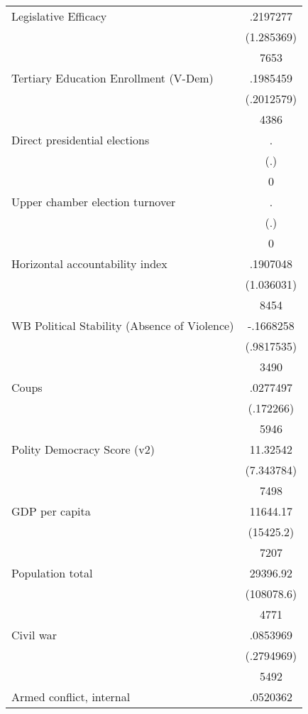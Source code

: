 {\begin{longtable}{l*{1}{c}}
Legislative Efficacy&    .2197277\\
                    &  (1.285369)\\
                    &        7653\\
Tertiary Education Enrollment (V-Dem)&    .1985459\\
                    &  (.2012579)\\
                    &        4386\\
Direct presidential elections&           .\\
                    &         (.)\\
                    &           0\\
Upper chamber election turnover&           .\\
                    &         (.)\\
                    &           0\\
Horizontal accountability index&    .1907048\\
                    &  (1.036031)\\
                    &        8454\\
WB Political Stability (Absence of Violence)&   -.1668258\\
                    &  (.9817535)\\
                    &        3490\\
Coups               &    .0277497\\
                    &   (.172266)\\
                    &        5946\\
Polity Democracy Score (v2)&    11.32542\\
                    &  (7.343784)\\
                    &        7498\\
GDP per capita      &    11644.17\\
                    &   (15425.2)\\
                    &        7207\\
Population total    &    29396.92\\
                    &  (108078.6)\\
                    &        4771\\
Civil war           &    .0853969\\
                    &  (.2794969)\\
                    &        5492\\
Armed conflict, internal&    .0520362\\

\end{longtable}}
